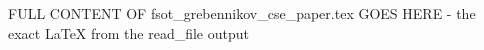 FULL CONTENT OF fsot_grebennikov_cse_paper.tex GOES HERE - the exact LaTeX from the read_file output